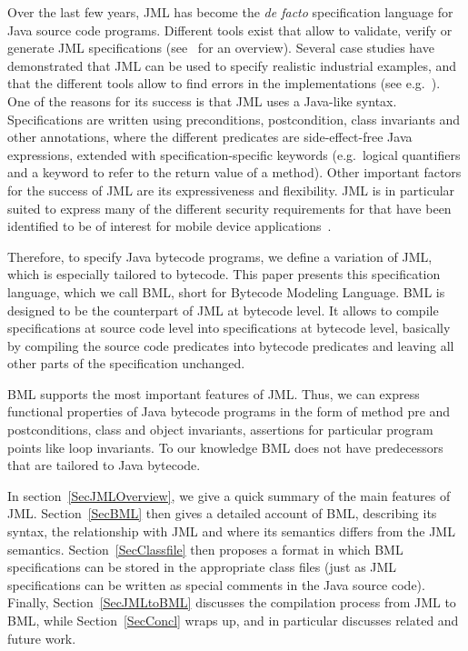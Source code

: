 Over the last few years, JML has become the \emph{de facto}
specification language for Java source code programs. Different tools
exist that allow to validate, verify or generate JML specifications
(see~\cite{BurdyCCEKLLP05} for an overview). Several case studies have
demonstrated that JML can be used to specify realistic industrial
examples, and that the different tools allow to find errors in the
implementations (see e.g.~\cite{BreunesseCHJ04}). One of the reasons
for its success is that JML uses a Java-like syntax. Specifications
are written using preconditions, postcondition, class invariants and
other annotations, where the different predicates are side-effect-free
Java expressions, extended with specification-specific keywords
(e.g.~logical quantifiers and a keyword to refer to the return value
of a method). Other important factors for the success of JML are its
expressiveness and flexibility. JML is in particular suited to express
many of the different security requirements for that have been
identified to be of interest for mobile device
applications~\cite{Deliverable1.2?}.


Therefore, to specify Java bytecode programs, we define a variation
of JML, which is especially tailored to bytecode. This paper
presents this specification language, which we call BML, short for
Bytecode Modeling Language. BML is designed to be the counterpart of
JML at bytecode level. It allows to compile specifications at source
code level into specifications at bytecode level, basically by
compiling the source code predicates into bytecode predicates and
leaving all other parts of the specification unchanged.

BML supports the most important features of JML. Thus, we can express
functional properties of Java bytecode programs in the form of method
pre and postconditions, class and object invariants, assertions for
particular program points like loop invariants. To our knowledge BML
does not have predecessors that are tailored to Java bytecode.

In section~\ref{SecJMLOverview}, we give a quick summary of the main
features of JML. Section~\ref{SecBML} then gives a detailed account of
BML, describing its syntax, the relationship with JML and where its
semantics differs from the JML semantics. Section~\ref{SecClassfile}
then proposes a format in which BML specifications can be stored in
the appropriate class files (just as JML specifications can be written
as special comments in the Java source code). Finally,
Section~\ref{SecJMLtoBML} discusses the compilation process from JML
to BML, while Section~\ref{SecConcl} wraps up, and in particular
discusses related and future work.


